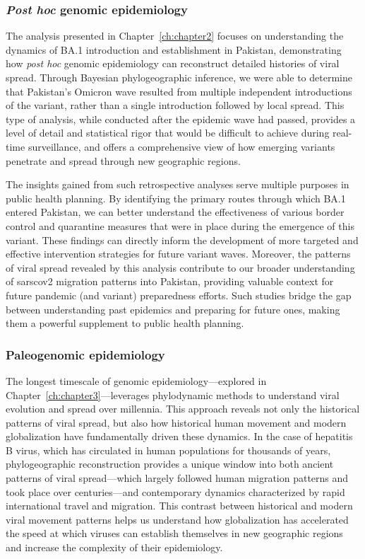 \subsubsection{\textit{Post hoc} genomic epidemiology}
The analysis presented in Chapter~\ref{ch:chapter2} focuses on understanding the dynamics of BA.1 introduction and establishment in Pakistan, demonstrating how \textit{post hoc} genomic epidemiology can reconstruct detailed histories of viral spread.
Through Bayesian phylogeographic inference, we were able to determine that Pakistan's Omicron wave resulted from multiple independent introductions of the variant, rather than a single introduction followed by local spread.
This type of analysis, while conducted after the epidemic wave had passed, provides a level of detail and statistical rigor that would be difficult to achieve during real-time surveillance, and offers a comprehensive view of how emerging variants penetrate and spread through new geographic regions.

The insights gained from such retrospective analyses serve multiple purposes in public health planning.
By identifying the primary routes through which BA.1 entered Pakistan, we can better understand the effectiveness of various border control and quarantine measures that were in place during the emergence of this variant.
These findings can directly inform the development of more targeted and effective intervention strategies for future variant waves.
Moreover, the patterns of viral spread revealed by this analysis contribute to our broader understanding of \gls{sarscov2} migration patterns into Pakistan, providing valuable context for future pandemic (and variant) preparedness efforts.
Such studies bridge the gap between understanding past epidemics and preparing for future ones, making them a powerful supplement to public health planning.

\subsubsection{Paleogenomic epidemiology}
The longest timescale of genomic epidemiology---explored in Chapter~\ref{ch:chapter3}---leverages phylodynamic methods to understand viral evolution and spread over millennia.
This approach reveals not only the historical patterns of viral spread, but also how historical human movement and modern globalization have fundamentally driven these dynamics.
In the case of hepatitis B virus, which has circulated in human populations for thousands of years, phylogeographic reconstruction provides a unique window into both ancient patterns of viral spread---which largely followed human migration patterns and took place over centuries---and contemporary dynamics characterized by rapid international travel and migration.
This contrast between historical and modern viral movement patterns helps us understand how globalization has accelerated the speed at which viruses can establish themselves in new geographic regions and increase the complexity of their epidemiology.
\cleardoublepage

